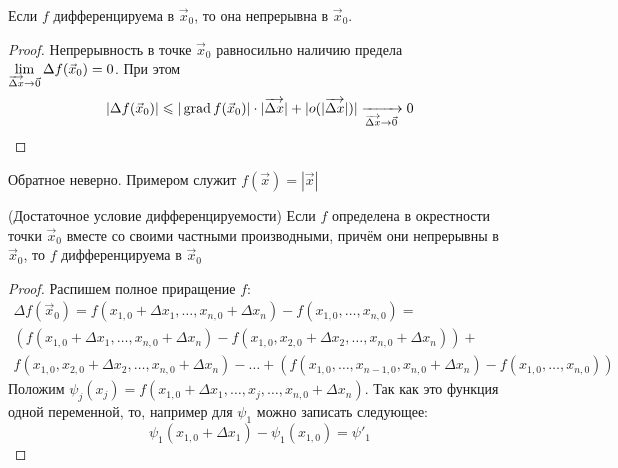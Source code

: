 \begin{theorem}
	Если $f$ дифференцируема в $\vec{x}_0$, то она непрерывна в $\vec{x}_0$.
\end{theorem}

\begin{proof}
	Непрерывность в точке $\vec{x}_0$ равносильно наличию предела $\lim\limits_{\overrightarrow{\Delta x} \to \vec{0}} \Delta f(\vec{x}_0) = 0$. При этом
	\[
		|\Delta f(\vec{x}_0)| \leqslant |\operatorname{grad} f(\vec{x}_0)| \cdot |\overrightarrow{\Delta x}| + |o(|\overrightarrow{\Delta x}|)| \xrightarrow[\overrightarrow{\Delta x} \to \vec{0}]{} 0
	\]
\end{proof}

\begin{example}
	Обратное неверно. Примером служит $f(\vec{x}) = |\vec{x}|$
\end{example}

\begin{theorem} (Достаточное условие дифференцируемости)
	Если $f$ определена в окрестности точки $\vec{x}_0$ вместе со своими частными производными, причём они непрерывны в $\vec{x}_0$, то $f$ дифференцируема в $\vec{x}_0$
\end{theorem}

\begin{proof}
	Распишем полное приращение $f$:
	\begin{multline*}
		\Delta f(\vec{x}_0) = f(x_{1, 0} + \Delta x_1, \ldots, x_{n, 0} + \Delta x_n) - f(x_{1, 0}, \ldots, x_{n, 0}) =
		\\
		\left(f(x_{1, 0} + \Delta x_1, \ldots, x_{n, 0} + \Delta x_n) - f(x_{1, 0}, x_{2, 0} + \Delta x_2, \ldots, x_{n, 0} + \Delta x_n)\right) +
		\\
		f(x_{1, 0}, x_{2, 0} + \Delta x_2, \ldots, x_{n, 0} + \Delta x_n) - \ldots + \left(f(x_{1, 0}, \ldots, x_{n - 1, 0}, x_{n, 0} + \Delta x_n) - f(x_{1, 0}, \ldots, x_{n, 0})\right)
	\end{multline*}
	Положим $\psi_j(x_j) = f(x_{1, 0} + \Delta x_1, \ldots, x_j, \ldots, x_{n, 0} + \Delta x_n)$. Так как это функция одной переменной, то, например для $\psi_1$ можно записать следующее:
	\[
		\psi_1(x_{1, 0} + \Delta x_1) - \psi_1(x_{1, 0}) = \psi'_1
	\]
\end{proof}